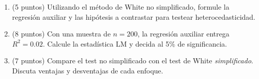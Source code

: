\documentclass[10pt,a4paper]{article}
\begin{document}
\begin{enumerate}
\begin{enumerate}
\item (5 puntos) Utilizando el método de White no simplificado, formule la {regresión auxiliar} y las {hipótesis} a contrastar para testear heterocedasticidad.

\item (8 puntos) Con una muestra de \(n=200\), la regresión auxiliar entrega \(R^2 = 0{.}02\).
Calcule la estadística LM y decida al 5\% de significancia.

\item (7 puntos) Compare el test no simplificado con el test de White \emph{simplificado}. Discuta ventajas y desventajas de cada enfoque.
\end{enumerate}










\end{enumerate}
\end{document}
